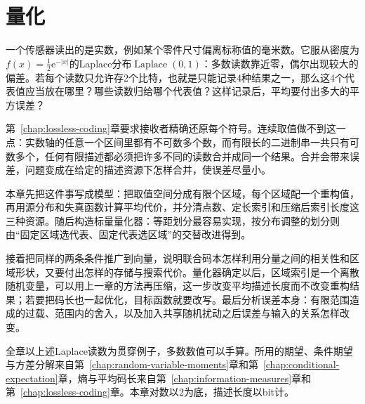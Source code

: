 \chapter{量化}
\label{chap:quantization}

一个传感器读出的是实数，例如某个零件尺寸偏离标称值的毫米数。它服从密度为$f(x)=\tfrac12\mathrm{e}^{-\lvert x\rvert}$的Laplace分布$\operatorname{Laplace}(0,1)$：多数读数靠近零，偶尔出现较大的偏差。若每个读数只允许存2个比特，也就是只能记录4种结果之一，那么这4个代表值应当放在哪里？哪些读数归给哪个代表值？这样记录后，平均要付出多大的平方误差？

第~\ref{chap:lossless-coding}章要求接收者精确还原每个符号。连续取值做不到这一点：实数轴的任意一个区间里都有不可数多个数，而有限长的二进制串一共只有可数多个，任何有限描述都必须把许多不同的读数合并成同一个结果。合并会带来误差，问题变成在给定的描述资源下怎样合并，使误差尽量小。

本章先把这件事写成模型：把取值空间分成有限个区域，每个区域配一个重构值，再用源分布和失真函数计算平均代价，并分清点数、定长索引和压缩后索引长度这三种资源。随后构造标量量化器：等距划分最容易实现，按分布调整的划分则由“固定区域选代表、固定代表选区域”的交替改进得到。

接着把同样的两条条件推广到向量，说明联合码本怎样利用分量之间的相关性和区域形状，又要付出怎样的存储与搜索代价。量化器确定以后，区域索引是一个离散随机变量，可以用上一章的方法再压缩，这一步改变平均描述长度而不改变重构结果；若要把码长也一起优化，目标函数就要改写。最后分析误差本身：有限范围造成的过载、范围内的舍入，以及加入共享随机扰动之后误差与输入的关系怎样改变。

全章以上述Laplace读数为贯穿例子，多数数值可以手算。所用的期望、条件期望与方差分解来自第~\ref{chap:random-variable-moments}章和第~\ref{chap:conditional-expectation}章，熵与平均码长来自第~\ref{chap:information-measures}章和第~\ref{chap:lossless-coding}章。本章对数以$2$为底，描述长度以bit计。












